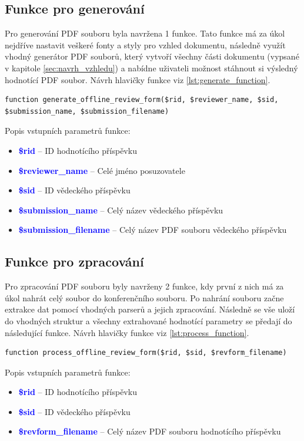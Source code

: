 \subsection{Funkce pro generování}
Pro generování PDF souboru byla navržena 1 funkce. Tato funkce má za úkol nejdříve nastavit veškeré fonty a styly pro vzhled dokumentu, následně využít vhodný generátor PDF souborů, který vytvoří všechny části dokumentu (vypsané v kapitole \ref{sec:navrh_vzhledu}) a nabídne uživateli možnost stáhnout si výsledný hodnotící PDF soubor. Návrh hlavičky funkce viz \ref{lst:generate_function}.

\lstset{style=phpstyle}
\begin{lstlisting}[caption = {Návrh hlavičky funkce pro generování PDF souboru}, label = {lst:generate_function}, captionpos=b]
function generate_offline_review_form($rid, $reviewer_name, $sid, $submission_name, $submission_filename)
\end{lstlisting}
Popis vstupních parametrů funkce:
\begin{itemize}
	\item\textcolor{blue}{\textbf{\$rid}} -- ID hodnotícího příspěvku
	\item\textcolor{blue}{\textbf{\$reviewer\_name}} -- Celé jméno posuzovatele
	\item\textcolor{blue}{\textbf{\$sid}} -- ID vědeckého příspěvku
	\item\textcolor{blue}{\textbf{\$submission\_name}} -- Celý název vědeckého příspěvku
	\item\textcolor{blue}{\textbf{\$submission\_filename}} -- Celý název PDF souboru vědeckého příspěvku
\end{itemize}

\subsection{Funkce pro zpracování}
Pro zpracování  PDF souboru byly navrženy 2 funkce, kdy první z nich má za úkol nahrát celý soubor do konferenčního souboru. Po nahrání souboru začne extrakce dat pomocí vhodných parserů a jejich zpracování. Následně se vše uloží do vhodných struktur a všechny extrahované hodnotící parametry se předají do následující funkce. Návrh hlavičky funkce viz \ref{lst:process_function}.

\begin{lstlisting}[caption = {Návrh hlavičky funkce pro extrakci dat}, label = {lst:process_function}, captionpos=b]
function process_offline_review_form($rid, $sid, $revform_filename)
\end{lstlisting}
Popis vstupních parametrů funkce:
\begin{itemize}
	\item\textcolor{blue}{\textbf{\$rid}} -- ID hodnotícího příspěvku
	\item\textcolor{blue}{\textbf{\$sid}} -- ID vědeckého příspěvku
	\item\textcolor{blue}{\textbf{\$revform\_filename}} -- Celý název PDF souboru hodnotícího příspěvku
\end{itemize}

